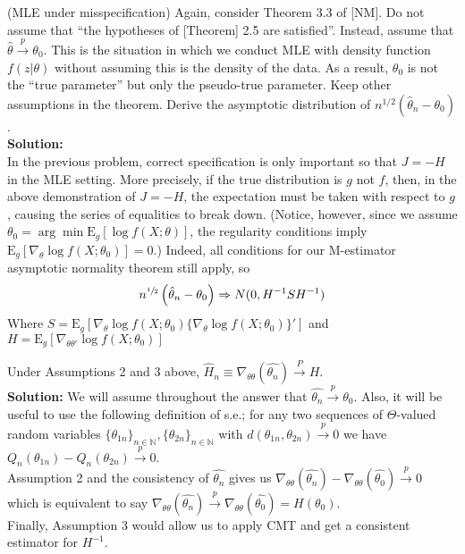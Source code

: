 \documentclass[11pt,letterpaper]{article}                  %
\begin{document}
\bigskip
\begin{problem} (MLE under misspecification) Again, consider Theorem 3.3 of [NM]. Do not assume that ``the hypotheses of [Theorem] 2.5 are satisfied''. Instead, assume that $\hat{\theta} \xrightarrow{p} \theta_0$. This is the situation in which we conduct MLE with density function $f(z | \theta)$ without assuming this is the density of the data. As a result, $\theta_0$ is not the ``true parameter'' but only the pseudo-true parameter. Keep other assumptions in the theorem. Derive the asymptotic distribution of $n^{1/2} ( \hat{\theta}_n - \theta_0 )$. \\
	
	\textbf{Solution:} \\
	
In the previous problem, correct specification is only important so
that $J = -H$ in the MLE setting. More precisely, if the true
distribution is $g$ not $f$, then, in the above demonstration of $J =
- H$, the expectation must be taken with respect to $g$, causing the
series of equalities to break down. (Notice, however, since we assume $\theta_0
= \arg\min \mathrm{E}_g[\log f(X;\theta)]$, the regularity conditions
imply $\mathrm{E}_g[\nabla_{\theta}\log f(X;\theta_0)] = 0$.) Indeed,
all conditions for
our M-estimator asymptotic normality theorem still apply, so
\begin{equation*}
  n^{\sfrac{1}{2}}\left( \hat{\theta}_n - \theta_0 \right) \Rightarrow
  N(0, H^{-1}S H^{-1})
\end{equation*}
Where $S = \mathrm{E}_g\left[\nabla_{\theta}\log f(X; \theta_0) \{\nabla_{\theta}\log
f(X; \theta_0)\}'\right]$ and $H = \mathrm{E}_g\left[ \nabla_{\theta\theta'}
  \log f(X; \theta_0)\right]$

\end{problem}

\bigskip
\begin{problem}
Under Assumptions 2 and 3 above, $\hat{H}_n \equiv \nabla_{\theta\theta}(\widehat{\theta_n}) \overset{P}{\rightarrow} H$.\\

\textbf{Solution:} We will assume throughout the answer that $\widehat{\theta_n}\overset{p}{\rightarrow}\theta_0$. Also, it will be useful to use the following definition of s.e.; for any two sequences of $\Theta$-valued random variables $\{\theta_{1n}\}_{n\in\mathbb{N}}, \{\theta_{2n}\}_{n\in\mathbb{N}}$ with $d(\theta_{1n},\theta_{2n})\overset{p}{\rightarrow}0$ we have $Q_n(\theta_{1n}) - Q_n(\theta_{2n})\overset{p}{\rightarrow}0$.\\

Assumption 2 and the consistency of $\widehat{\theta_n}$ gives us $\nabla_{\theta\theta}(\widehat{\theta_n}) - \nabla_{\theta\theta}(\widehat{\theta_0}) \overset{p}{\rightarrow}0$ which is equivalent to say $\nabla_{\theta\theta}(\widehat{\theta_n}) \overset{p}{\rightarrow} \nabla_{\theta\theta}(\widehat{\theta_0}) = H(\theta_0)$.\\

Finally, Assumption 3 would allow us to apply CMT and get a consistent estimator for $H^{-1}$.
\end{problem}
\end{document}
